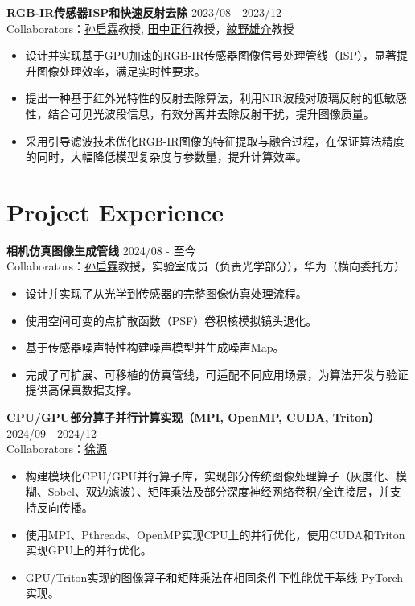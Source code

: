 \documentclass[a4paper,11pt]{article}
\newcommand{\projectspace}{\vspace{8pt}}
\begin{document}
\projectspace
\textbf{RGB-IR传感器ISP和快速反射去除} \hfill 2023/08 - 2023/12 \\
Collaborators：\href{https://scholar.google.com/citations?hl=zh-CN&user=igqPS8sAAAAJ&view_op=list_works&sortby=pubdate}{孙启霖}教授, \href{https://www.vip.sc.eng.isct.ac.jp/mtanaka/}{田中正行}教授，\href{http://www.ok.sc.e.titech.ac.jp/~ymonno/}{紋野雄介}教授
\begin{itemize}[noitemsep]
\item 设计并实现基于GPU加速的RGB-IR传感器图像信号处理管线（ISP），显著提升图像处理效率，满足实时性要求。
\item 提出一种基于红外光特性的反射去除算法，利用NIR波段对玻璃反射的低敏感性，结合可见光波段信息，有效分离并去除反射干扰，提升图像质量。
\item 采用引导滤波技术优化RGB-IR图像的特征提取与融合过程，在保证算法精度的同时，大幅降低模型复杂度与参数量，提升计算效率。
\end{itemize}

\section*{Project Experience}
\projectspace
\textbf{相机仿真图像生成管线} \hfill 2024/08 - 至今 \\
Collaborators：\href{https://scholar.google.com/citations?hl=zh-CN&user=igqPS8sAAAAJ&view_op=list_works&sortby=pubdate}{孙启霖}教授，实验室成员（负责光学部分），华为（横向委托方）
\begin{itemize}[noitemsep]
\item 设计并实现了从光学到传感器的完整图像仿真处理流程。
\item 使用空间可变的点扩散函数（PSF）卷积核模拟镜头退化。
\item 基于传感器噪声特性构建噪声模型并生成噪声Map。
\item 完成了可扩展、可移植的仿真管线，可适配不同应用场景，为算法开发与验证提供高保真数据支撑。
\end{itemize}

\projectspace
\textbf{CPU/GPU部分算子并行计算实现（MPI, OpenMP, CUDA, Triton）} \hfill 2024/09 - 2024/12 \\
Collaborators：\href{https://github.com/EnderturtleOrz}{徐源}
\begin{itemize}[noitemsep]
\item 构建模块化CPU/GPU并行算子库，实现部分传统图像处理算子（灰度化、模糊、Sobel、双边滤波）、矩阵乘法及部分深度神经网络卷积/全连接层，并支持反向传播。
\item 使用MPI、Pthreads、OpenMP实现CPU上的并行优化，使用CUDA和Triton实现GPU上的并行优化。
\item GPU/Triton实现的图像算子和矩阵乘法在相同条件下性能优于基线-PyTorch实现。
\end{itemize}
\end{document}
